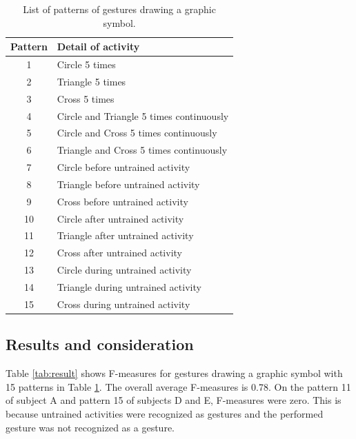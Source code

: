 \documentclass{sigchi-ext}
\begin{document}
        \begin{table}[!t]
            \centering
            \caption{List of patterns of gestures drawing a graphic symbol.}
            \label{tab:gesture-pattern}
            \begin{tabular}{c|l}\hline\hline
                Pattern & Detail of activity \\ \hline
                1 & Circle 5 times \\
                2 & Triangle 5 times  \\
                3 & Cross 5 times \\
                4 & Circle and Triangle 5 times continuously \\
                5 & Circle and Cross 5 times continuously \\
                6 & Triangle and Cross 5 times continuously \\
                7 & Circle before untrained activity \\
                8 & Triangle before untrained activity \\
                9 & Cross before untrained activity \\
                10 & Circle after untrained activity \\
                11 & Triangle after untrained activity \\
                12 & Cross after untrained activity \\
                13 & Circle during untrained activity \\
                14 & Triangle during untrained activity \\
                15 & Cross during untrained activity \\\hline
            \end{tabular}
        \end{table}
        
        \subsection{Results and consideration}\label{sec:symbol}
        Table \ref{tab:result} shows F-measures for gestures drawing a graphic symbol with 15 patterns in Table \ref{tab:gesture-pattern}. The overall average F-measures is 0.78. On the pattern 11 of subject A and pattern 15 of subjects D and E, F-measures were zero. This is because untrained activities were recognized as gestures and the performed gesture was not recognized as a gesture.
\end{document}
